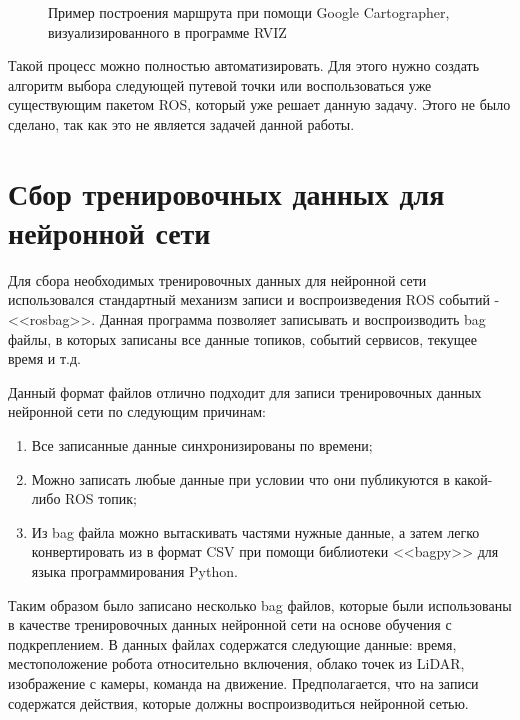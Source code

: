 \begin{figure}[ht]
    \caption{Пример построения маршрута при помощи Google Cartographer, визуализированного в программе RVIZ}\label{fig:path}
\end{figure}

Такой процесс можно полностью автоматизировать. Для этого нужно создать алгоритм выбора следующей путевой точки или воспользоваться уже существующим пакетом ROS, который уже решает данную задачу. Этого не было сделано, так как это не является задачей данной работы.

\section{Сбор тренировочных данных для нейронной сети}

Для сбора необходимых тренировочных данных для нейронной сети использовался стандартный механизм записи и воспроизведения ROS событий - <<rosbag>>. Данная программа позволяет записывать и воспроизводить bag файлы, в которых записаны все данные топиков, событий сервисов, текущее время и т.д. 

Данный формат файлов отлично подходит для записи тренировочных данных нейронной сети по следующим причинам:

\begin{enumerate}[beginpenalty=10000] %
  \item Все записанные данные синхронизированы по времени;
  \item Можно записать любые данные при условии что они публикуются в какой-либо ROS топик; 
  \item Из bag файла можно вытаскивать частями нужные данные, а затем легко конвертировать из в формат CSV при помощи библиотеки <<bagpy>> для языка программирования Python.
\end{enumerate}

Таким образом было записано несколько bag файлов, которые были использованы в качестве тренировочных данных нейронной сети на основе обучения с подкреплением. В данных файлах содержатся следующие данные: время, местоположение робота относительно включения, облако точек из LiDAR, изображение с камеры, команда на движение. Предполагается, что на записи содержатся действия, которые должны воспроизводиться нейронной сетью. 

